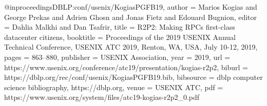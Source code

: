 @inproceedings{DBLP:conf/usenix/KogiasPGFB19,
  author = {Marios Kogias and George Prekas and Adrien Ghosn and Jonas Fietz and Edouard Bugnion},
  editor = {Dahlia Malkhi and Dan Tsafrir},
  title = {{R2P2}: Making RPCs first-class datacenter citizens},
  booktitle = {Proceedings of the 2019 USENIX Annual Technical Conference, USENIX ATC 2019, Renton, WA, USA, July 10-12, 2019},
  pages = {863--880},
  publisher = {USENIX Association},
  year = {2019},
  url = {https://www.usenix.org/conference/atc19/presentation/kogias-r2p2},
  biburl = {https://dblp.org/rec/conf/usenix/KogiasPGFB19.bib},
  bibsource = {dblp computer science bibliography, https://dblp.org},
  venue = {USENIX ATC},
  pdf = {https://www.usenix.org/system/files/atc19-kogias-r2p2_0.pdf}
}
